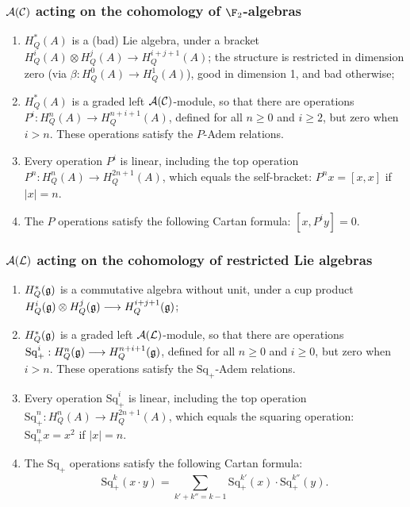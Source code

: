\documentclass[10pt]{article}
\newcommand{\SqShift}{\Sq_{+}}
\newcommand{\Sq}{\mathrm{Sq}}
\newcommand{\Comm}{\calC}
\newcommand{\LieSteen}{\calA(\calL)}
\newcommand{\CommSteen}{\calA(\Comm)}
\begin{document}
\begin{SteenrodAlgebrasAndTheirKoszulDuals}
\subsubsection{$\CommSteen$ acting on the cohomology of $\F_2$-algebras}
\begin{enumerate}\squishlist
\setlength{\parindent}{.25in}
\item $H^*_Q(A)$ is a (bad) Lie algebra, under a bracket $H^i_Q(A)\otimes H^j_Q(A)\to H^{i+j+1}_Q(A)$; the structure is restricted in dimension zero (via $\beta:H^0_Q(A)\to H^1_Q(A)$), good in dimension 1, and bad otherwise;
\item $H^*_Q(A)$ is a graded left $\CommSteen$-module, so that there are operations $P^i:H^n_Q(A)\to H^{n+i+1}_Q(A)$, defined for all $n\geq0$ and $i\geq2$, but zero when $i>n$. These operations satisfy the $P$-Adem relations.
\item Every operation $P^i$ is linear, including the top operation $P^n:H^n_Q(A)\to H^{2n+1}_Q(A)$, which equals the self-bracket:  $P^nx=[x,x]$ if $|x|=n$.
\item The $P$ operations satisfy the following Cartan formula:
$[x,P^iy]=0$.
\end{enumerate}

\subsubsection{$\LieSteen$ acting on the cohomology of restricted Lie algebras}
\begin{enumerate}\squishlist
\setlength{\parindent}{.25in}
\item $H^*_Q(\mathfrak{g})$ is a commutative algebra without unit, under a cup product $H^i_Q(\mathfrak{g})\otimes H^j_Q(\mathfrak{g})\longrightarrow H^{i+j+1}_Q(\mathfrak{g})$;
\item $H^*_Q(\mathfrak{g})$ is a graded left $\LieSteen$-module, so that there are operations $\SqShift^i:H^n_Q(\frakg)\to H^{n+i+1}_Q(\frakg)$, defined for all $n\geq0$ and $i\geq0$, but zero when $i>n$. These operations satisfy the $\SqShift$-Adem relations.
\item Every operation $\SqShift^i$ is linear, including the top operation $\SqShift^n:H^n_Q(A)\to H^{2n+1}_Q(A)$, which equals the squaring operation:  $\SqShift^nx=x^2$ if $|x|=n$.
\item The $\SqShift$ operations satisfy the following Cartan formula:
\[\SqShift^k(x\cdot y)=\sum_{k'+k''=k-1}\SqShift^{k'}(x)\cdot \SqShift^{k''}(y).\]
\end{enumerate}


\end{SteenrodAlgebrasAndTheirKoszulDuals}
\end{document}
